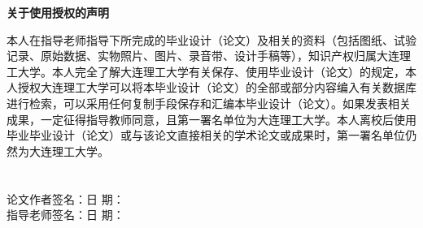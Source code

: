 
{\hfill \erhao{}\textbf {关于使用授权的声明} \hfill}
\label{grant}
\thispagestyle{headFancy}
\vspace*{18pt}
\linespread{1.25}
\song\xiaosan

本人在指导老师指导下所完成的毕业设计（论文）及相关的资料（包括图纸、试验记录、原始数据、实物照片、图片、录音带、设计手稿等），知识产权归属大连理工大学。本人完全了解大连理工大学有关保存、使用毕业设计（论文）的规定，本人授权大连理工大学可以将本毕业设计（论文）的全部或部分内容编入有关数据库进行检索，可以采用任何复制手段保存和汇编本毕业设计（论文）。如果发表相关成果，一定征得指导教师同意，且第一署名单位为大连理工大学。本人离校后使用毕业毕业设计（论文）或与该论文直接相关的学术论文或成果时，第一署名单位仍然为大连理工大学。\\
~\\
~\\
论文作者签名：\hspace{5cm}日  期：\\
指导老师签名：\hspace{5cm}日  期：

